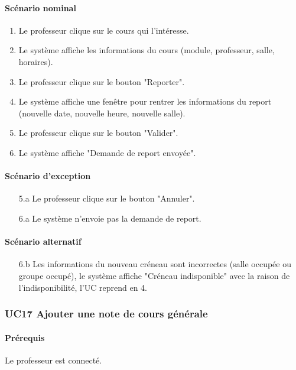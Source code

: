 \documentclass[a4paper,12pt]{article}
\begin{document}
\paragraph{Scénario nominal}
\begin{enumerate}
    \item Le professeur clique sur le cours qui l'intéresse.
    \item Le système affiche les informations du cours (module, professeur, salle, horaires).
    \item Le professeur clique sur le bouton "Reporter".
    \item Le système affiche une fenêtre pour rentrer les informations du report (nouvelle date, nouvelle heure, nouvelle salle).
    \item Le professeur clique sur le bouton "Valider".
    \item Le système affiche "Demande de report envoyée".
\end{enumerate}

\paragraph{Scénario d'exception}
\begin{enumerate}
    \item[5.a] Le professeur clique sur le bouton "Annuler".
    \item[6.a] Le système n'envoie pas la demande de report.
\end{enumerate}

\paragraph{Scénario alternatif}
\begin{enumerate}
    \item[6.b] Les informations du nouveau créneau sont incorrectes (salle occupée ou groupe occupé), le système affiche "Créneau indisponible" avec la raison de l'indisponibilité, l'UC reprend en 4.
\end{enumerate}

\subsubsection{UC17 Ajouter une note de cours générale}
\paragraph{Prérequis} Le professeur est connecté.
\end{document}
